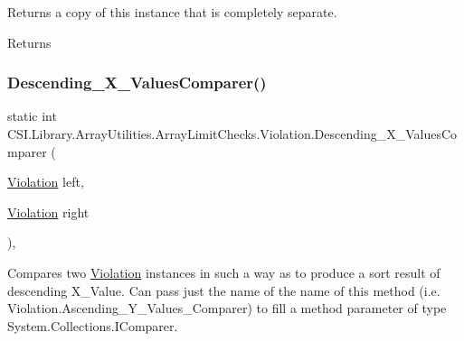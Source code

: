 Returns a copy of this instance that is completely separate. 

\begin{DoxyReturn}{Returns}

\end{DoxyReturn}
\mbox{\label{class_c_s_i_1_1_library_1_1_array_utilities_1_1_array_limit_checks_1_1_violation_a697887c43a44ef0ce30e74359fa3f1ea}} 
\subsubsection{\texorpdfstring{Descending\_X\_ValuesComparer()}{Descending\_X\_ValuesComparer()}}
{\footnotesize\ttfamily static int C\+S\+I.\+Library.\+Array\+Utilities.\+Array\+Limit\+Checks.\+Violation.\+Descending\+\_\+\+X\+\_\+\+Values\+Comparer (\begin{DoxyParamCaption}\item[{\mbox{\hyperlink{class_c_s_i_1_1_library_1_1_array_utilities_1_1_array_limit_checks_1_1_violation}{Violation}}}]{left,  }\item[{\mbox{\hyperlink{class_c_s_i_1_1_library_1_1_array_utilities_1_1_array_limit_checks_1_1_violation}{Violation}}}]{right }\end{DoxyParamCaption})\hspace{0.3cm}{\ttfamily [inline]}, {\ttfamily [static]}}



Compares two \mbox{\hyperlink{class_c_s_i_1_1_library_1_1_array_utilities_1_1_array_limit_checks_1_1_violation}{Violation}} instances in such a way as to produce a sort result of descending X\+\_\+\+Value. Can pass just the name of the name of this method (i.\+e. Violation.\+Ascending\+\_\+\+Y\+\_\+\+Values\+\_\+\+Comparer) to fill a method parameter of type System.\+Collections.\+I\+Comparer. 


